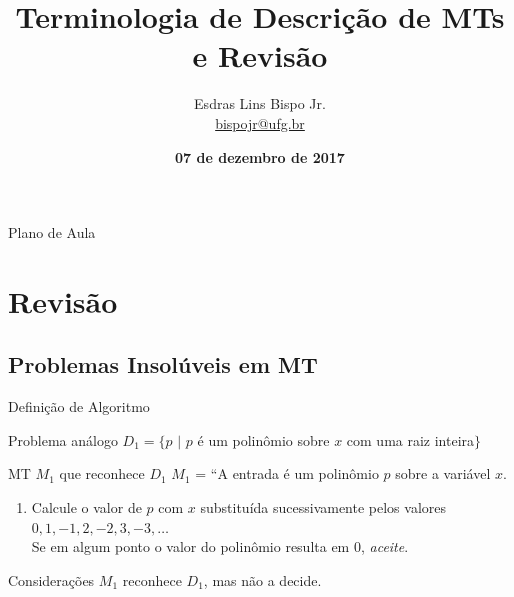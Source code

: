 \documentclass[xcolor=dvipsnames,table]{beamer}
\title{Terminologia de Descrição de MTs e Revisão}
\author{
  Esdras Lins Bispo Jr. \\ \url{bispojr@ufg.br}
  }
\institute{
  Teoria da Computação \\Bacharelado em Ciência da Computação}
\date{\textbf{07 de dezembro de 2017} }
\begin{document}
	\begin{frame}
		\titlepage
	\end{frame}

	\AtBeginSection{
		\begin{frame}{Sumário}%
    		\tableofcontents[currentsection]
		\end{frame}
	}

	\begin{frame}{Plano de Aula}
		\tableofcontents
	\end{frame}
	
	
	\section{Revisão}
	\subsection{Problemas Insolúveis em MT}
	
	\begin{frame}{Definição de Algoritmo}
		\begin{block}{Problema análogo}
			$D_1 = \{p \mbox{ | } p$ é um polinômio sobre $x$ com uma raiz inteira$\}$
		\end{block}  
		\begin{block}{MT $M_1$ que reconhece $D_1$}
			$M_1$ = ``A entrada é um polinômio $p$ sobre a variável $x$.
			\begin{enumerate}
				\item Calcule o valor de $p$ com $x$ substituída sucessivamente pelos valores $0, 1,-1, 2, -2, 3, -3, \ldots$ \\Se em algum ponto o valor do polinômio resulta em $0$, {\it aceite}.
			\end{enumerate}
		\end{block} 
		\begin{block}{Considerações}
			$M_1$ reconhece $D_1$, mas não a decide.
		\end{block}
	\end{frame} 
	
\end{document}
